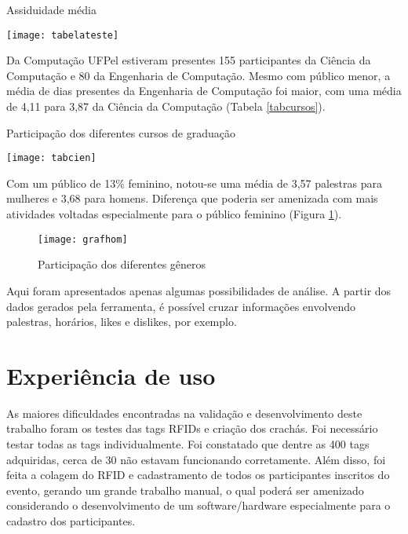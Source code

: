 \documentclass[tcc,capa]{texufpel}
\begin{document}
            \begin{table}[H]
            \caption{Assiduidade média} 
                \centering \texttt{[image: tabelateste]}
                \label{pres}
            \end{table}
            
            Da Computação UFPel estiveram presentes 155 participantes da Ciência da Computação e 80 da Engenharia de Computação. Mesmo com público menor, a média de dias presentes da Engenharia de Computação foi maior, com uma média de 4,11 para 3,87 da Ciência da Computação (Tabela \ref{tabcursos}).
            
            \begin{table}[H]
            \caption{Participação dos diferentes cursos de graduação}
                \centering \texttt{[image: tabcien]}
                 
                \label{tabcursos}
            \end{table}
            
            Com um público de  13\% feminino, notou-se uma média de 3,57 palestras para mulheres e 3,68 para homens. Diferença que poderia ser amenizada com mais atividades voltadas especialmente para o público feminino (Figura \ref{homemmul}).
            
            \begin{figure}[H]
                \centering \texttt{[image: grafhom]}
                \caption{Participação dos diferentes gêneros} 
                \label{homemmul}
            \end{figure}
            Aqui foram apresentados apenas algumas possibilidades de análise. A partir dos dados gerados pela ferramenta, é possível cruzar informações envolvendo palestras, horários, likes e dislikes, por exemplo.
            
 \section{Experiência de uso}

    As maiores dificuldades encontradas na validação e desenvolvimento deste trabalho foram os testes das tags RFIDs e criação dos crachás. Foi necessário testar todas as tags individualmente. Foi constatado que dentre as 400 tags adquiridas, cerca de 30 não estavam funcionando corretamente. Além disso, foi feita a colagem do RFID e cadastramento de todos os participantes inscritos do evento, gerando um grande trabalho manual, o qual poderá ser amenizado considerando o desenvolvimento de um software/hardware especialmente para o cadastro dos participantes.
    
\end{document}
